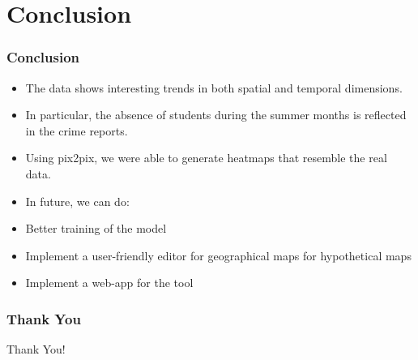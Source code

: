 \documentclass{beamer}
\begin{document}
\section{Conclusion}
\begin{frame}
    \frametitle{Conclusion}
    \begin{itemize}
        \item The data shows interesting trends in both spatial and temporal dimensions.
        \item In particular, the absence of students during the summer months is reflected in the crime reports.
        \item Using pix2pix, we were able to generate heatmaps that resemble the real data.
        \item In future, we can do:
        \item \quad Better training of the model
        \item \quad Implement a user-friendly editor for geographical maps for hypothetical maps
        \item \quad Implement a web-app for the tool
    \end{itemize}
\end{frame}

\begin{frame}
    \frametitle{Thank You}
    \centering
    \Huge Thank You!
\end{frame}
\end{document}
